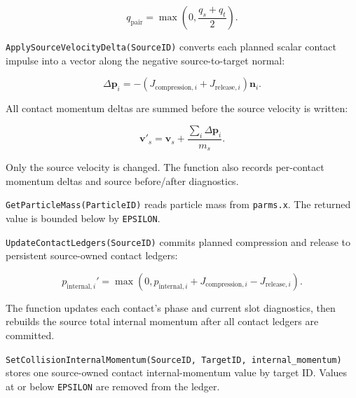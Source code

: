 \begin{equation}
q_{\mathrm{pair}} = \max\left(0,\frac{q_s+q_t}{2}\right).
\end{equation}


\texttt{ApplySourceVelocityDelta(SourceID)} converts each planned scalar
contact impulse into a vector along the negative source-to-target normal:

\begin{equation}
\Delta\mathbf{p}_i
=
-(J_{\mathrm{compression},i}+J_{\mathrm{release},i})\mathbf{n}_i.
\end{equation}

All contact momentum deltas are summed before the source velocity is written:

\begin{equation}
\mathbf{v}'_s
=
\mathbf{v}_s+\frac{\sum_i\Delta\mathbf{p}_i}{m_s}.
\end{equation}

Only the source velocity is changed.  The function also records per-contact
momentum deltas and source before/after diagnostics.


\texttt{GetParticleMass(ParticleID)} reads particle mass from
\texttt{parms.x}.  The returned value is bounded below by \texttt{EPSILON}.


\texttt{UpdateContactLedgers(SourceID)} commits planned compression and release
to persistent source-owned contact ledgers:

\begin{equation}
p_{\mathrm{internal},i}'
=
\max(0,
p_{\mathrm{internal},i}
+ J_{\mathrm{compression},i}
- J_{\mathrm{release},i}).
\end{equation}

The function updates each contact's phase and current slot diagnostics, then
rebuilds the source total internal momentum after all contact ledgers are
committed.


\texttt{SetCollisionInternalMomentum(SourceID, TargetID, internal\_momentum)}
stores one source-owned contact internal-momentum value by target ID.  Values at
or below \texttt{EPSILON} are removed from the ledger.



